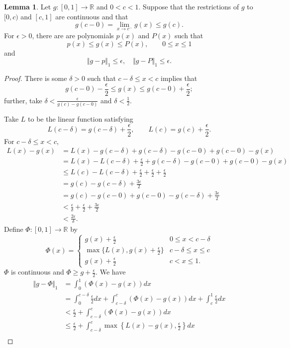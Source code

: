 \documentclass{article}
\newcommand{\norm}[1]{\Vert #1 \Vert}
\theoremstyle{definition}
\newtheorem{lemma}[theorem]{Lemma}
\begin{document}
\begin{lemma}
Let $g:[0,1] \to \mathbb{R}$ and $0<c<1$. Suppose that the restrictions of
$g$ to $[0,c)$ and $[c,1]$ are continuous and that
\[
g(c-0)=\lim_{x \to c^-} g(x) \leq g(c).
\]
For $\epsilon>0$, there are
are polynomials $p(x)$ and $P(x)$ such that
\[
p(x) \leq g(x) \leq P(x), \qquad 0 \leq x \leq 1
\]
and
\[
\norm{g-p}_1 \leq \epsilon, \quad \norm{g-P}_1 \leq \epsilon.
\]
\label{weierstrass}
\end{lemma}
\begin{proof}
There is some $\delta>0$ such that
 $c-\delta \leq x<c$ implies that
\[
g(c-0)-\frac{\epsilon}{2} \leq g(x) \leq g(c-0)+\frac{\epsilon}{2};
\]
further, take $\delta<\frac{\epsilon}{g(c)-g(c-0)}$ and $\delta<\frac{1}{2}$.

Take $L$ to be the linear function satisfying
\[
L(c-\delta) = g(c-\delta)+\frac{\epsilon}{2}, \qquad L(c)=g(c)+\frac{\epsilon}{2}.
\]
For $c-\delta \leq x < c$,
\begin{align*}
L(x)-g(x)&=L(x)-g(c-\delta)+g(c-\delta)-g(c-0)+g(c-0)-g(x)\\
&=L(x)-L(c-\delta)+\frac{\epsilon}{2}+g(c-\delta)-g(c-0)+g(c-0)-g(x)\\
&\leq L(c)-L(c-\delta) +\frac{\epsilon}{2} +\frac{\epsilon}{2}+\frac{\epsilon}{2}\\
&=g(c)-g(c-\delta)+\frac{3\epsilon}{2}\\
&= g(c)-g(c-0)+g(c-0)-g(c-\delta)+\frac{3\epsilon}{2}\\
&<\frac{\epsilon}{\delta}+\frac{\epsilon}{2}+\frac{3\epsilon}{2}\\
&<\frac{2\epsilon}{\delta}.
\end{align*}
Define $\Phi:[0,1] \to \mathbb{R}$ by
\[
\Phi(x)=\begin{cases}
g(x)+\frac{\epsilon}{2}&0 \leq x < c-\delta\\
\max\{L(x),g(x)+\frac{\epsilon}{2}\}&c-\delta \leq x \leq c\\
g(x)+\frac{\epsilon}{2}&c<x \leq 1.
\end{cases}
\]
$\Phi$ is continuous and $\Phi \geq g + \frac{\epsilon}{2}$. 
We have
\begin{align*}
\norm{g-\Phi}_1&=\int_0^1(\Phi(x)-g(x)) dx\\
&=\int_0^{c-\delta} \frac{\epsilon}{2} dx + \int_{c-\delta}^c (\Phi(x)-g(x)) dx
+\int_c^1 \frac{\epsilon}{2} dx\\
&< \frac{\epsilon}{2} + \int_{c-\delta}^c (\Phi(x)-g(x)) dx\\
&\leq \frac{\epsilon}{2}+\int_{c-\delta}^c \max\left\{L(x)-g(x),\frac{\epsilon}{2}\right\} dx\\

\end{align*}
\end{proof}
\end{document}
